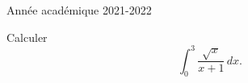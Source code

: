 \documentclass[a4paper, 11pt,openany]{book}%
\newtheorem[L]{thm}{Théorème}[section]
\newtheorem[M]{propo}[thm]{Proposition}
\newtheorem[M]{prop}[thm]{Propriété}
\newtheorem[M]{coro}[thm]{Corollaire}
\newtheorem[M]{lem}[thm]{Lemme}
\newtheorem[M,bodystyle=]{defi}[thm]{Définition}
\newtheorem[M,bodystyle=]{remark}[thm]{Remarque}
\newtheorem[M,bodystyle=]{met}[thm]{Méthode}
\newtheorem[M,bodystyle=]{ret}[thm]{A retenir}
\newtheorem[M,bodystyle=]{idee}[thm]{Idée}
\newtheorem[style=S,underline=false,bodystyle=]{exem}[thm]{Exemple}
\newtheorem[S,underline=false,bodystyle=]{exo}[thm]{Exercice}
\newtheorem[S,underline=false,bodystyle=]{appli}[thm]{Application}
\newtheorem[S,underline=false,bodystyle=]{sol}[thm]{Solution}
\newtheorem[S,underline=false,bodystyle=]{hypo}[thm]{Hypothesis}
\newtheorem[S,underline=false,bodystyle=]{nota}[thm]{Notation}
\begin{document}
\begin{titlepage}
\begin{sffamily}
\begin{center}

    \vfill

    {\large Année académique 2021-2022}

  \end{center}
  \end{sffamily}
\end{titlepage}



\begin{exo}

Calculer
\[ \int_0^3 \frac{\sqrt{x}}{x +1} \, dx.\]

\end{exo}


\begin{sol}

%
\end{sol}
\end{document}

